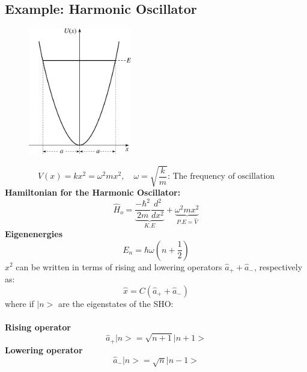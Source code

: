 \documentclass[12pt,fancychapters]{report}
\numberwithin{equation}{section}
\begin{document}
\subsection{Example: Harmonic Oscillator}
\begin{figure}[h]
  \centering
	\includegraphics[width=0.4\textwidth]{../Figures/HO.png}
\end{figure}
\begin{equation*}
	V(x) = kx^2 = \omega^2 m x^2,\,\,\,\,\,\,\omega = \sqrt{\frac{k}{m}}:\,\text{The frequency of
	oscillation}
\end{equation*}
\textbf{Hamiltonian for the Harmonic Oscillator:}
\begin{equation*}
	\hat{H}_o =\underbrace{\frac{-\hbar^2}{2m}\frac{d^2}{dx^2}}_{K.E} + \underbrace{\omega^2 m x^2}_
	{P.E = \hat{V}}
\end{equation*}
\textbf{Eigenenergies}
\begin{equation*}
	E_n = \hbar\omega\left(n + \frac{1}{2}\right)
\end{equation*}
$x^2$ can be written in terms of rising and lowering operators $\hat{a}_+ + \hat{a}_-$, respectively
as:
\begin{equation*}
	\hat{x} =	C \left(\hat{a}_+ + \hat{a}_-\right)
\end{equation*}
where if $\big|n\big>$ are the eigenstates of the SHO:\\
\\
\textbf{Rising operator}
\begin{equation*}
	\hat{a}_+ \big|n\big> = \sqrt{n +1}\big|n+1\big>
\end{equation*}
\textbf{Lowering operator}
\begin{equation*}
	\hat{a}_- \big|n\big> = \sqrt{n}\big|n-1\big>
\end{equation*}
\end{document}
